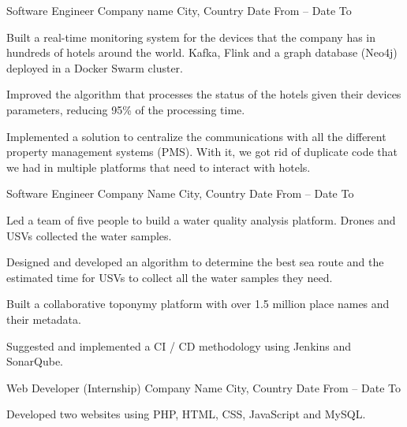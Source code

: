 \documentclass[]{awesome-cv}
\begin{document}
\begin{cventries}
	\cventry
	{Software Engineer}
	{Company name}
	{City, Country}
	{Date From – Date To}
	{\begin{cvitems}
		\vspace{0.5mm}
		\item {Built a real-time monitoring system for the devices that the company has in hundreds of hotels around the world. Kafka, Flink and a graph database (Neo4j) deployed in a Docker Swarm cluster.}
		\item {Improved the algorithm that processes the status of the hotels given their devices\textquotesingle{} parameters, reducing 95\% of the processing time.}
		\item {Implemented a solution to centralize the communications with all the different property management systems (PMS). With it, we got rid of duplicate code that we had in multiple platforms that need to interact with hotels.}
		\end{cvitems}}

	\cventry
	{Software Engineer}
	{Company Name}
	{City, Country}
	{Date From – Date To}
	{\begin{cvitems}
		\vspace{0.5mm}
		\item {Led a team of five people to build a water quality analysis platform. Drones and USVs collected the water samples.}
		\item {Designed and developed an algorithm to determine the best sea route and the estimated time for USVs to collect all the water samples they need.}
		\item {Built a collaborative toponymy platform with over 1.5 million place names and their metadata.}
		\item {Suggested and implemented a CI / CD methodology using Jenkins and SonarQube.}
		\end{cvitems}}

	\cventry
	{Web Developer (Internship)}
	{Company Name}
	{City, Country}
	{Date From – Date To}
	{\begin{cvitems}
		\vspace{0.5mm}
		\item {Developed two websites using PHP, HTML, CSS, JavaScript and MySQL.}
		\end{cvitems}}
\end{cventries}
\end{document}
